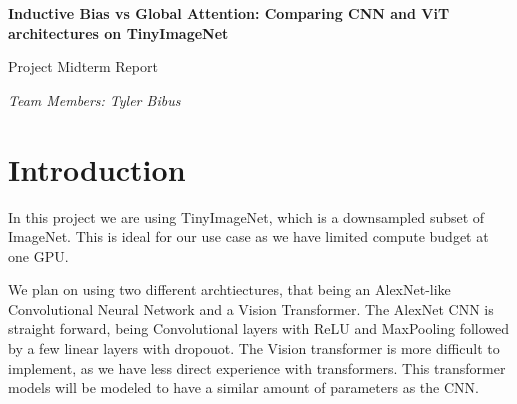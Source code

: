 \documentclass[11pt]{article}
\begin{document}
\begin{center}
{\Large \textbf{Inductive Bias vs Global Attention: Comparing CNN and ViT architectures on TinyImageNet}

\vspace{10pt}

Project Midterm Report}

\vspace{10pt}

\textit{Team Members: Tyler Bibus}
\end{center}




\begin{abstract}
  This project is on comparing Convolutional Neural Networks against Vision Transformers on TinyImageNet.
  The primary motivation behind this is to determine if similarly sized CNNs and ViTs perform dramatically differently.
  Convolutional neural networks used to dominate image classification on ImageNet, but now vision transformers are the new favorite.
  This project aims to see if CNNs still have a place against ViTs for image classification like on TinyImageNet.

  Currently TinyImageNet has been downloaded, normalized, and prepared with Pytorch and Pandas.
  An initial AlexNet-like model has been created with pytorch and has been trained with reasonable accuracies, with the best being 22.4\% validation accuracy.
\end{abstract}

\section{Introduction}

In this project we are using TinyImageNet, which is a downsampled subset of ImageNet.
This is ideal for our use case as we have limited compute budget at one GPU.

We plan on using two different archtiectures, that being an AlexNet-like Convolutional Neural Network and a Vision Transformer.
The AlexNet CNN is straight forward, being Convolutional layers with ReLU and MaxPooling followed by a few linear layers with dropouot.
The Vision transformer is more difficult to implement, as we have less direct experience with transformers. This transformer models will be modeled to have a similar amount of parameters as the CNN.
\end{document}

